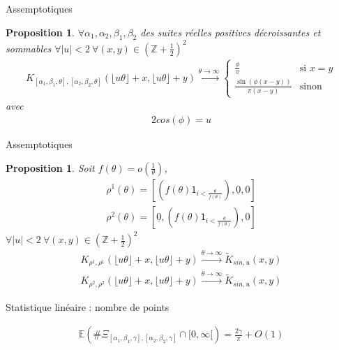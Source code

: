 \documentclass[french]{beamer}
\newtheorem{proposition}[theorem]{Proposition}
\begin{document}
\begin{frame}{Assemptotiques}
\begin{proposition}
$\forall \alpha_1,\alpha_2,\beta_1,\beta_2$ des suites réelles positives décroissantes et sommables $\forall |u| <2  \ \forall (x,y) \in (\mathbb{Z}+\frac{1}{2})^2$ 
\begin{align*}
 K_{[\alpha_1,\beta_1,\theta],[\alpha_2,\beta_2,\theta]}(\lfloor u\theta \rfloor +x, \lfloor u\theta \rfloor +y ) \overset{\theta\to\infty}{\longrightarrow}
\left\{\begin{matrix}
\frac{\phi }{\pi}\  & \text{si } x=y
\\ 
\frac{\sin(\phi(x-y))}{\pi(x-y)} &\text{sinon} 
\end{matrix}\right.
\end{align*}
avec
\begin{align*}
 2cos(\phi)=u
 \end{align*}
\end{proposition}
\end{frame}

\begin{frame}{Assemptotiques}
\begin{proposition}
Soit $f(\theta)=o(\frac{1}{\theta})$, 
\begin{align*}\rho^1(\theta)=[(f(\theta)\mathsf{1}_{i<\frac{\theta}{f(\theta)}}),\underline{0},0]\\ \rho^2(\theta)=[\underline{0},(f(\theta)\mathsf{1}_{i<\frac{\theta}{f(\theta)}}),0]
\end{align*}
$\forall |u| <2  \ \forall (x,y) \in (\mathbb{Z}+\frac{1}{2})^2$
\begin{align*}
 K_{\rho^1,\rho^1}(\lfloor u\theta \rfloor +x, \lfloor u\theta \rfloor +y ) \overset{\theta\to\infty}{\longrightarrow}
\tilde{K}_{sin,u}(x,y)\\ K_{\rho^2,\rho^2}(\lfloor u\theta \rfloor +x, \lfloor u\theta \rfloor +y ) \overset{\theta\to\infty}{\longrightarrow}
\tilde{K}_{sin,u}(x,y)
\end{align*}

\end{proposition}
\end{frame}
\begin{frame}{Statistique linéaire  : nombre de points}
\begin{theorem}
\begin{align*}
\mathbb{E}(\#\Xi_{[\alpha_1,\beta_1,\gamma],[\alpha_2,\beta_2,\gamma]}\cap [0,\infty[)=\frac{2\gamma}{\pi}+O(1)
\end{align*}
\end{theorem}
\end{frame}
\end{document}
